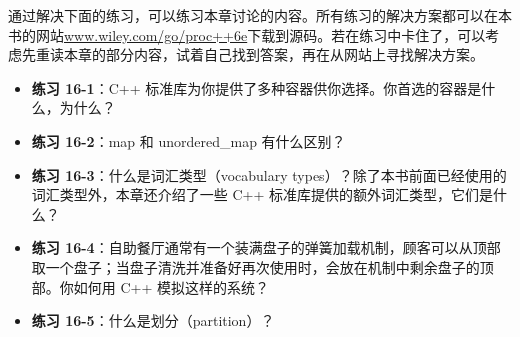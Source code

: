 通过解决下面的练习，可以练习本章讨论的内容。所有练习的解决方案都可以在本书的网站\url{www.wiley.com/go/proc++6e}下载到源码。若在练习中卡住了，可以考虑先重读本章的部分内容，试着自己找到答案，再在从网站上寻找解决方案。


\begin{itemize}
\item
\textbf{练习 16-1}：C++ 标准库为你提供了多种容器供你选择。你首选的容器是什么，为什么？

\item
\textbf{练习 16-2}：map 和 unordered\_map 有什么区别？

\item
\textbf{练习 16-3}：什么是词汇类型（vocabulary types）？除了本书前面已经使用的词汇类型外，本章还介绍了一些 C++ 标准库提供的额外词汇类型，它们是什么？

\item
\textbf{练习 16-4}：自助餐厅通常有一个装满盘子的弹簧加载机制，顾客可以从顶部取一个盘子；当盘子清洗并准备好再次使用时，会放在机制中剩余盘子的顶部。你如何用 C++ 模拟这样的系统？

\item
\textbf{练习 16-5}：什么是划分（partition）？
\end{itemize}